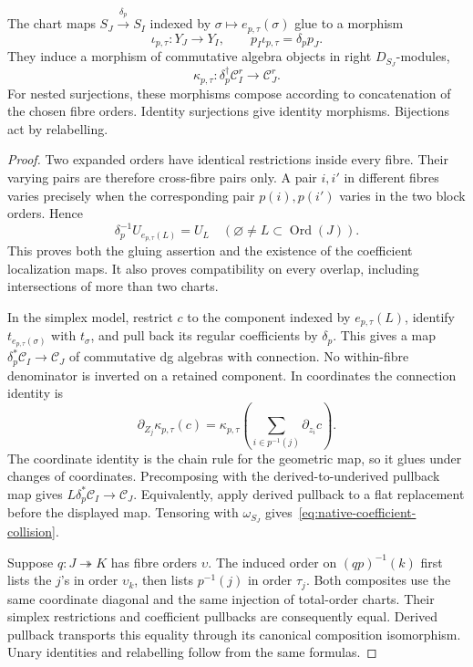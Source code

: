 \begin{theorem}
\label{thm:native-ordered-collision}
The chart maps $S_J\xrightarrow{\delta_p}S_I$ indexed by
$\sigma\mapsto e_{p,\tau}(\sigma)$ glue to a morphism
\[
 \iota_{p,\tau}:Y_J\longrightarrow Y_I,
 \qquad p_I\iota_{p,\tau}=\delta_p p_J.
\]
They induce a morphism of commutative algebra objects in right
$D_{S_J}$-modules,
\begin{equation}\label{eq:native-coefficient-collision}
 \kappa_{p,\tau}:\delta_p^\dagger\mathcal C_I^r
                   \longrightarrow\mathcal C_J^r.
\end{equation}
For nested surjections, these morphisms compose according to
concatenation of the chosen fibre orders. Identity surjections
give identity morphisms. Bijections act by relabelling.
\end{theorem}
\begin{proof}
Two expanded orders have identical restrictions inside every fibre.
Their varying pairs are therefore cross-fibre pairs only. A pair
$i,i'$ in different fibres varies precisely when the corresponding
pair $p(i),p(i')$ varies in the two block orders. Hence
\[
 \delta_p^{-1}U_{e_{p,\tau}(L)}=U_L
 \quad(\varnothing\ne L\subset\operatorname{Ord}(J)).
\]
This proves both the gluing assertion and the existence of the
coefficient localization maps. It also proves compatibility on
every overlap, including intersections of more than two charts.

In the simplex model, restrict $c$ to the component indexed by
$e_{p,\tau}(L)$, identify $t_{e_{p,\tau}(\sigma)}$ with
$t_\sigma$, and pull back its regular coefficients by $\delta_p$.
This gives a map $\delta_p^*\mathcal C_I\to\mathcal C_J$ of
commutative dg algebras with connection. No within-fibre
denominator is inverted on a retained component.
In coordinates the connection identity is
\[
 \partial_{Z_j}\kappa_{p,\tau}(c)
 =\kappa_{p,\tau}\left(\sum_{i\in p^{-1}(j)}\partial_{z_i}c\right).
\]
The coordinate identity is the chain rule for the geometric map,
so it glues under changes of coordinates. Precomposing with the
derived-to-underived pullback map gives $L\delta_p^*\mathcal C_I
\to\mathcal C_J$. Equivalently, apply derived pullback to a
flat replacement before the displayed map. Tensoring with
$\omega_{S_J}$ gives~\eqref{eq:native-coefficient-collision}.

Suppose $q:J\twoheadrightarrow K$ has fibre orders $\upsilon$.
The induced order on $(qp)^{-1}(k)$ first lists the $j$'s in
order $\upsilon_k$, then lists $p^{-1}(j)$ in order $\tau_j$.
Both composites use the same coordinate diagonal and the same
injection of total-order charts. Their simplex restrictions and
coefficient pullbacks are consequently equal. Derived pullback
transports this equality through its canonical composition
isomorphism. Unary identities and relabelling follow from the
same formulas.
\end{proof}

